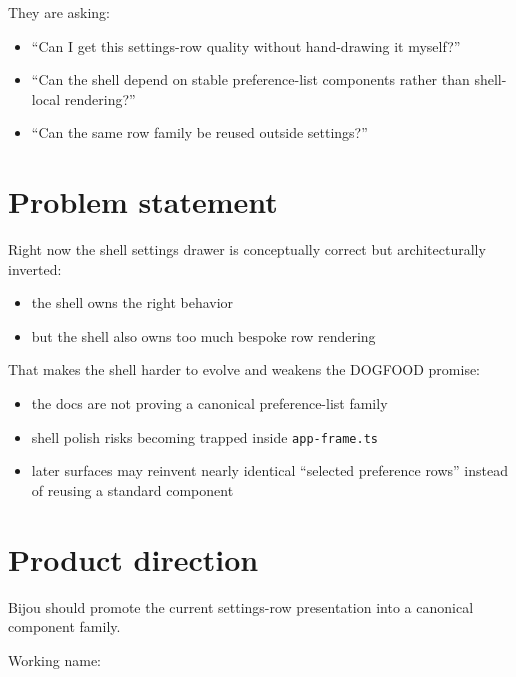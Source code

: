They are asking:

\begin{itemize}
\tightlist
\item
  ``Can I get this settings-row quality without hand-drawing it myself?''
\item
  ``Can the shell depend on stable preference-list components rather than shell-local rendering?''
\item
  ``Can the same row family be reused outside settings?''
\end{itemize}

\section{Problem statement}\label{record-054-problem-statement}

Right now the shell settings drawer is conceptually correct but architecturally inverted:

\begin{itemize}
\tightlist
\item
  the shell owns the right behavior
\item
  but the shell also owns too much bespoke row rendering
\end{itemize}

That makes the shell harder to evolve and weakens the DOGFOOD promise:

\begin{itemize}
\tightlist
\item
  the docs are not proving a canonical preference-list family
\item
  shell polish risks becoming trapped inside \texttt{a\allowbreak{}p\allowbreak{}p\allowbreak{}-\allowbreak{}f\allowbreak{}r\allowbreak{}a\allowbreak{}m\allowbreak{}e\allowbreak{}.\allowbreak{}t\allowbreak{}s}
\item
  later surfaces may reinvent nearly identical ``selected preference rows'' instead of reusing a standard component
\end{itemize}

\section{Product direction}\label{record-054-product-direction}

Bijou should promote the current settings-row presentation into a canonical component family.

Working name:

